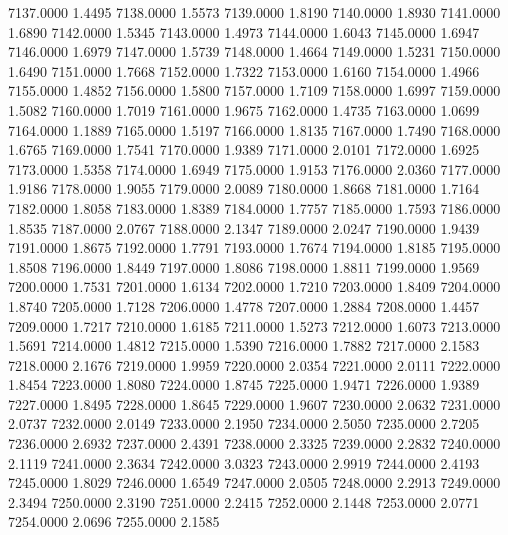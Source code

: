 7137.0000      1.4495
7138.0000      1.5573
7139.0000      1.8190
7140.0000      1.8930
7141.0000      1.6890
7142.0000      1.5345
7143.0000      1.4973
7144.0000      1.6043
7145.0000      1.6947
7146.0000      1.6979
7147.0000      1.5739
7148.0000      1.4664
7149.0000      1.5231
7150.0000      1.6490
7151.0000      1.7668
7152.0000      1.7322
7153.0000      1.6160
7154.0000      1.4966
7155.0000      1.4852
7156.0000      1.5800
7157.0000      1.7109
7158.0000      1.6997
7159.0000      1.5082
7160.0000      1.7019
7161.0000      1.9675
7162.0000      1.4735
7163.0000      1.0699
7164.0000      1.1889
7165.0000      1.5197
7166.0000      1.8135
7167.0000      1.7490
7168.0000      1.6765
7169.0000      1.7541
7170.0000      1.9389
7171.0000      2.0101
7172.0000      1.6925
7173.0000      1.5358
7174.0000      1.6949
7175.0000      1.9153
7176.0000      2.0360
7177.0000      1.9186
7178.0000      1.9055
7179.0000      2.0089
7180.0000      1.8668
7181.0000      1.7164
7182.0000      1.8058
7183.0000      1.8389
7184.0000      1.7757
7185.0000      1.7593
7186.0000      1.8535
7187.0000      2.0767
7188.0000      2.1347
7189.0000      2.0247
7190.0000      1.9439
7191.0000      1.8675
7192.0000      1.7791
7193.0000      1.7674
7194.0000      1.8185
7195.0000      1.8508
7196.0000      1.8449
7197.0000      1.8086
7198.0000      1.8811
7199.0000      1.9569
7200.0000      1.7531
7201.0000      1.6134
7202.0000      1.7210
7203.0000      1.8409
7204.0000      1.8740
7205.0000      1.7128
7206.0000      1.4778
7207.0000      1.2884
7208.0000      1.4457
7209.0000      1.7217
7210.0000      1.6185
7211.0000      1.5273
7212.0000      1.6073
7213.0000      1.5691
7214.0000      1.4812
7215.0000      1.5390
7216.0000      1.7882
7217.0000      2.1583
7218.0000      2.1676
7219.0000      1.9959
7220.0000      2.0354
7221.0000      2.0111
7222.0000      1.8454
7223.0000      1.8080
7224.0000      1.8745
7225.0000      1.9471
7226.0000      1.9389
7227.0000      1.8495
7228.0000      1.8645
7229.0000      1.9607
7230.0000      2.0632
7231.0000      2.0737
7232.0000      2.0149
7233.0000      2.1950
7234.0000      2.5050
7235.0000      2.7205
7236.0000      2.6932
7237.0000      2.4391
7238.0000      2.3325
7239.0000      2.2832
7240.0000      2.1119
7241.0000      2.3634
7242.0000      3.0323
7243.0000      2.9919
7244.0000      2.4193
7245.0000      1.8029
7246.0000      1.6549
7247.0000      2.0505
7248.0000      2.2913
7249.0000      2.3494
7250.0000      2.3190
7251.0000      2.2415
7252.0000      2.1448
7253.0000      2.0771
7254.0000      2.0696
7255.0000      2.1585
